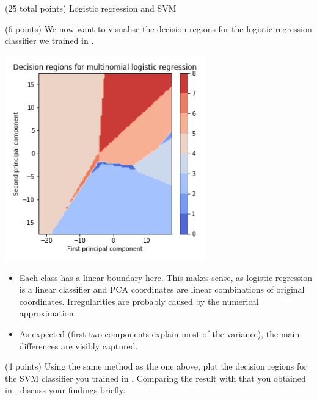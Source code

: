 \documentclass[12pt]{article}
\begin{document}
\begin{question}{(25 total points) Logistic regression and SVM}
\begin{subquestion}{(6 points)
       We now want to visualise the decision regions for the logistic
       regression classifier we trained in .
     }
   

      \begin{answerbox}{35em}
                  \begin{center}
	\includegraphics[width=0.65\textwidth]{imgs/2_3.png}
	\end{center}
	\begin{itemize}
	\itemsep -3pt {}
	\item Each class has a linear boundary here. This makes sense, as logistic regression is a linear classifier and PCA coordinates are linear combinations of original coordinates. Irregularities are probably caused by the numerical approximation.\
\item As expected (first two components explain most of the variance), the main differences are visibly captured.
	\end{itemize}
      \end{answerbox}
  


   \end{subquestion}
   \begin{subquestion}{(4 points)
       Using the same method as the one above, plot the decision regions for
       the SVM classifier you trained in \refQ{Q2.2}.
       Comparing the result with that you obtained in , discuss your
       findings briefly.
     } \label{Q2.4}
   


\end{subquestion}
\end{question}
\end{document}
